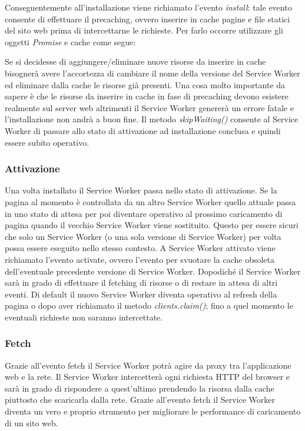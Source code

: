 \documentclass[11pt ,a4paper , twoside , openright ]{article}
\begin{document}
Conseguentemente all’installazione viene richiamato l’evento \textit{install}: tale evento consente di effettuare il precaching, ovvero inserire in cache pagine e file statici del sito web prima di intercettarne le richieste. Per farlo occorre utilizzare gli oggetti \textit{Promise} e cache come segue:
\pagebreak

Se si decidesse di aggiungere/eliminare nuove risorse da inserire in cache bisognerà avere l’accortezza di cambiare il nome della versione del Service Worker ed eliminare dalla cache le risorse già presenti.
Una cosa molto importante da sapere è che le risorse da inserire in cache in fase di precaching devono esistere realmente sul server web altrimenti il Service Worker genererà un errore fatale e l’installazione non andrà a buon fine. 
Il metodo \textit{skipWaiting()} consente al Service Worker di passare allo stato di attivazione ad installazione conclusa e quindi essere subito operativo.

\subsubsection{Attivazione}
Una volta installato il Service Worker passa nello stato di attivazione. Se la pagina al momento è controllata da un altro Service Worker quello attuale passa in uno stato di attesa per poi diventare operativo al prossimo caricamento di pagina quando il vecchio Service Worker viene sostituito.
Questo per essere sicuri che solo un Service Worker (o una sola versione di Service Worker) per volta possa essere eseguito nello stesso contesto.
A Service Worker attivato viene richiamato l’evento activate, ovvero l'evento per svuotare la cache obsoleta dell’eventuale precedente versione di Service Worker. Dopodiché il Service Worker sarà in grado di effettuare il fetching di risorse o di restare in attesa di altri eventi.
Di default il nuovo Service Worker diventa operativo al refresh della pagina o dopo aver richiamato il metodo \textit{clients.claim()}; fino a quel momento le eventuali richieste non saranno intercettate. 

\subsubsection{Fetch}
Grazie all’evento fetch il Service Worker potrà agire da proxy tra l’applicazione web e la rete.
Il Service Worker intercetterà ogni richiesta HTTP del browser e sarà in grado di rispondere a quest’ultimo prendendo la risorsa dalla cache piuttosto che scaricarla dalla rete.
Grazie all’evento fetch il Service Worker diventa un vero e proprio strumento per migliorare le performance di caricamento di un sito web.
\end{document}
